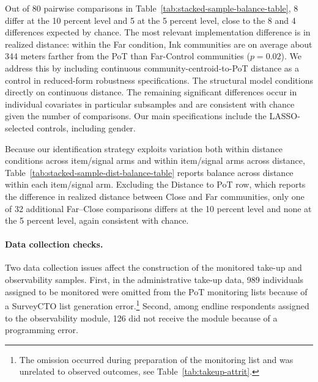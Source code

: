 \documentclass[ECM\space ReStud.tex]{subfiles}
\begin{document}

Out of 80 pairwise comparisons in Table~\ref{tab:stacked-sample-balance-table}, 8 differ at the 10 percent level and 5 at the 5 percent level, close to the 8 and 4 differences expected by chance. The most relevant implementation difference is in realized distance: within the Far condition, Ink communities are on average about 344 meters farther from the PoT than Far-Control communities (\(p=0.02\)). We address this by including continuous community-centroid-to-PoT distance as a control in reduced-form robustness specifications. The structural model conditions directly on continuous distance. The remaining significant differences occur in individual covariates in particular subsamples and are consistent with chance given the number of comparisons. Our main specifications include the LASSO-selected controls, including gender.

Because our identification strategy exploits variation both within distance conditions across item/signal arms and within item/signal arms across distance, Table~\ref{tab:stacked-sample-dist-balance-table} reports balance across distance within each item/signal arm. Excluding the Distance to PoT row, which reports the difference in realized distance between Close and Far communities, only one of 32 additional Far--Close comparisons differs at the 10 percent level and none at the 5 percent level, again consistent with chance.


\paragraph{Data collection checks.}
Two data collection issues affect the construction of the monitored take-up and observability samples. First, in the administrative take-up data, 989 individuals assigned to be monitored were omitted from the PoT monitoring lists because of a SurveyCTO list generation error.\footnote{The omission occurred during preparation of the monitoring list and was unrelated to observed outcomes, see Table~\ref{tab:takeup-attrit}.} Second, among endline respondents assigned to the observability module, 126 did not receive the module because of a programming error.
\end{document}
